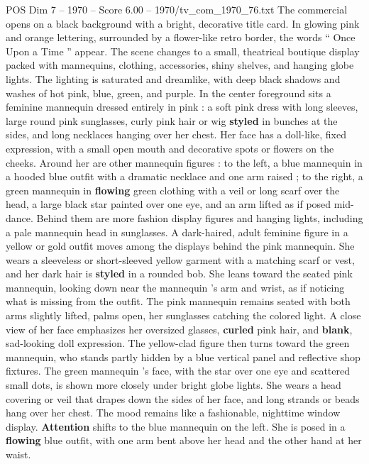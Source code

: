 \begin{textsample}{POS Dim 7 – 1970 – Score 6.00 – 1970/tv\_com\_1970\_76.txt}  \label{ex:f7_pos_040}
The commercial opens on a black background with a bright, decorative title card.
In glowing pink and orange lettering, surrounded by a flower-like retro border, the words “ Once Upon a Time ” appear.
The scene changes to a small, theatrical boutique display packed with mannequins, clothing, accessories, shiny shelves, and hanging globe lights.
The lighting is saturated and dreamlike, with deep black shadows and washes of hot pink, blue, green, and purple.
In the center foreground sits a feminine mannequin dressed entirely in pink : a soft pink dress with long sleeves, large round pink sunglasses, curly pink hair or wig \textbf{styled} in bunches at the sides, and long necklaces hanging over her chest.
Her face has a doll-like, fixed expression, with a small open mouth and decorative spots or flowers on the cheeks.
Around her are other mannequin figures : to the left, a blue mannequin in a hooded blue outfit with a dramatic necklace and one arm raised ; to the right, a green mannequin in \textbf{flowing} green clothing with a veil or long scarf over the head, a large black star painted over one eye, and an arm lifted as if posed mid-dance.
Behind them are more fashion display figures and hanging lights, including a pale mannequin head in sunglasses.
A dark-haired, adult feminine figure in a yellow or gold outfit moves among the displays behind the pink mannequin.
She wears a sleeveless or short-sleeved yellow garment with a matching scarf or vest, and her dark hair is \textbf{styled} in a rounded bob.
She leans toward the seated pink mannequin, looking down near the mannequin ’s arm and wrist, as if noticing what is missing from the outfit.
The pink mannequin remains seated with both arms slightly lifted, palms open, her sunglasses catching the colored light.
A close view of her face emphasizes her oversized glasses, \textbf{curled} pink hair, and \textbf{blank}, sad-looking doll expression.
The yellow-clad figure then turns toward the green mannequin, who stands partly hidden by a blue vertical panel and reflective shop fixtures.
The green mannequin ’s face, with the star over one eye and scattered small dots, is shown more closely under bright globe lights.
She wears a head covering or veil that drapes down the sides of her face, and long strands or beads hang over her chest.
The mood remains like a fashionable, nighttime window display. \textbf{Attention} shifts to the blue mannequin on the left.
She is posed in a \textbf{flowing} blue outfit, with one arm bent above her head and the other hand at her waist.

\end{textsample}
